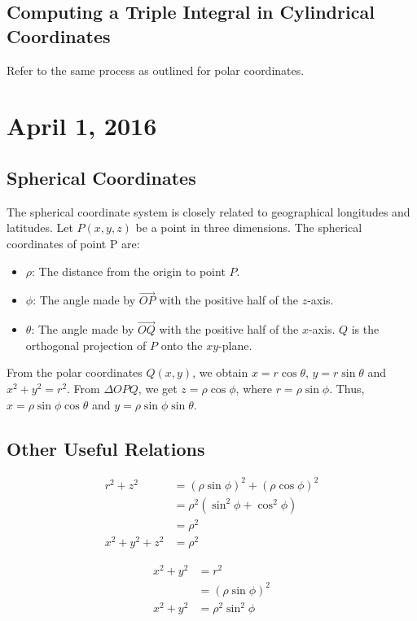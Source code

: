 \documentclass[11pt]{article}
\theoremstyle{plain} %
\theoremstyle{definition}
\theoremstyle{example}
\theoremstyle{remark}
\begin{document}
\subsection{Computing a Triple Integral in Cylindrical Coordinates}

Refer to the same process as outlined for polar coordinates. 

\section{April 1, 2016}

\subsection{Spherical Coordinates}

The spherical coordinate system is closely related to geographical longitudes and latitudes. Let $P(x, y, z)$ be a point in three dimensions. The spherical coordinates of point P are:

\begin{itemize}
	\item $\rho$: The distance from the origin to point $P$.
	\item $\phi$: The angle made by $\overrightarrow{OP}$ with the positive half of the $z$-axis. 
	\item $\theta$: The angle made by $\overrightarrow{OQ}$ with the positive half of the $x$-axis. $Q$ is the orthogonal projection of $P$ onto the $xy$-plane.
\end{itemize}

From the polar coordinates $Q(x,y)$, we obtain $x=r\cos\theta$, $y = r \sin\theta$ and $x^2+y^2=r^2$. From $\Delta OPQ$, we get $z = \rho \cos\phi$, where $r = \rho \sin\phi$. Thus, $x= \rho\sin\phi\cos\theta$ and $y = \rho\sin\phi\sin\theta$.

\subsection{Other Useful Relations}

\begin{align*}
	r^2+z^2 &= (\rho\sin\phi)^2+(\rho\cos\phi)^2\\
	&= \rho^2\left(\sin^2\phi+\cos^2\phi\right)\\
	&= \rho^2\\
	x^2+y^2+z^2 &= \rho^2
\end{align*}

\begin{align*}
x^2+y^2&=r^2\\
&= (\rho\sin\phi)^2\\
x^2+y^2 &= \rho^2\sin^2\phi
\end{align*}
\end{document}
